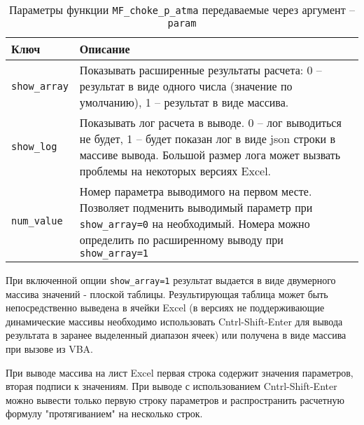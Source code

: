 \begin{table}[H]
	\caption{Параметры функции \texttt{MF_choke_p_atma} передаваемые через аргумент -- \texttt{param}}
	\label{table:param_list}
	\begin{tabular}{p{}p{}}
		\hline
		Ключ & Описание  \\ \hline
		\texttt{show_array} & Показывать расширенные результаты расчета: 0 -- результат в виде одного числа (значение по умолчанию), 1 -- результат в виде массива.    \\ \hline
		
		\texttt{show_log} & Показывать лог расчета в выводе. 0 -- лог выводиться не будет, 1 -- будет показан лог в виде json строки в массиве вывода. Большой размер лога может вызвать проблемы на некоторых версиях Excel.   \\ \hline
		
		\texttt{num_value} & Номер параметра выводимого на первом месте. Позволяет подменить выводимый параметр при \texttt{show_array=0} на необходимый. Номера можно определить по расширенному выводу при \texttt{show_array=1}  \\ \hline
		
	\end{tabular}
\end{table}

При включенной опции \texttt{show_array=1} результат выдается в виде двумерного массива значений - плоской таблицы. Результирующая таблица может быть непосредственно выведена в ячейки Excel (в версиях не поддерживающие динамические массивы необходимо использовать Cntrl-Shift-Enter для вывода результата в заранее выделенный диапазон ячеек) или получена в виде массива при вызове из VBA.

При выводе массива на лист Excel первая строка содержит значения параметров, вторая подписи к значениям. При выводе с использованием Cntrl-Shift-Enter можно вывести только первую строку параметров и распространить расчетную формулу "протягиванием" на несколько строк.


